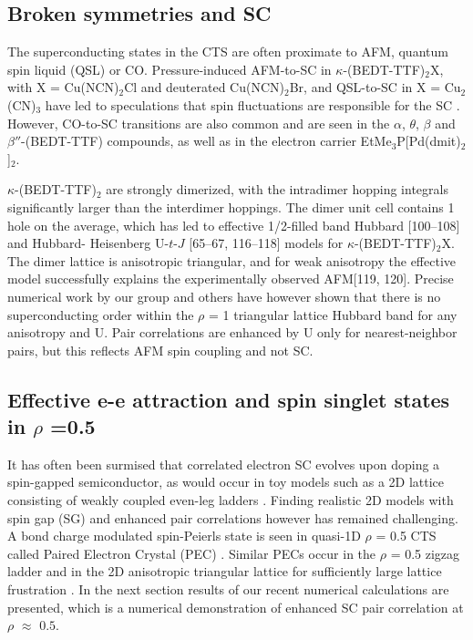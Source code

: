 \documentclass[a4paper,12pt]{article}
\begin{document}
\subsection{Broken symmetries and SC}
The superconducting states in the CTS are often proximate to AFM, quantum spin liquid (QSL) or CO. 
Pressure-induced AFM-to-SC in $\kappa$-(BEDT-TTF)$_{2}$X, 
with X = Cu(NCN)$_{2}$Cl and deuterated Cu(NCN)$_{2}$Br, and QSL-to-SC in X = Cu$_{2}$(CN)$_{3}$ have led to speculations that
spin fluctuations are responsible for the SC \cite{nevidomskyy08a,kino98a,schmalian98a}. However, CO-to-SC transitions
are also common and are seen in the $\alpha$, $\theta$, $\beta$ and  $\beta''$-(BEDT-TTF) compounds, 
as well as in the electron carrier EtMe$_{3}$P[Pd(dmit)$_{2}$]$_{2}$. 

 $\kappa$-(BEDT-TTF)$_{2}$ are strongly dimerized, with the intradimer
hopping integrals significantly larger than the interdimer hoppings. The dimer unit cell contains
1 hole on the average, which has led to effective 1/2-filled band Hubbard [100–108] and Hubbard-
Heisenberg U-$t$-$J$ [65–67, 116–118] models for $\kappa$-(BEDT-TTF)$_{2}$X. The dimer lattice is anisotropic triangular,
and for weak anisotropy the effective model successfully explains the experimentally observed AFM[119, 120]. 
Precise numerical work by our group \cite{ngomes12a, clay08a, dayal12a} and others \cite{tocchio09a, yanagisawa13a} 
have however shown that there is no superconducting order within the $\rho$ = 1 triangular lattice Hubbard band
for any anisotropy and U. Pair correlations are enhanced by U only for nearest-neighbor pairs, but this reflects AFM spin coupling and not SC.

\subsection{Effective e-e attraction and spin singlet states in $\rho$ =0.5}
It has often been surmised that correlated electron SC evolves upon doping a spin-gapped semiconductor, 
as would occur in toy models such as a 2D lattice consisting of weakly coupled even-leg ladders \cite{arrigoni04a,troyer96a}.
Finding realistic 2D models with spin gap (SG) and enhanced pair correlations however has remained challenging. 
A bond charge modulated spin-Peierls state is seen in quasi-1D $\rho$ = 0.5 CTS called Paired Electron Crystal (PEC) \cite{clay12a}. 
Similar PECs occur in the $\rho$ = 0.5 zigzag ladder \cite{clay05a} and in the 2D anisotropic triangular lattice for sufficiently 
large lattice frustration \cite{dayal11a,li10a}. In the next section results of our recent numerical calculations \cite{ngomes16} 
are presented, which is a numerical demonstration of enhanced SC pair correlation at $\rho$ $\approx$ $0.5$. 
\end{document}
